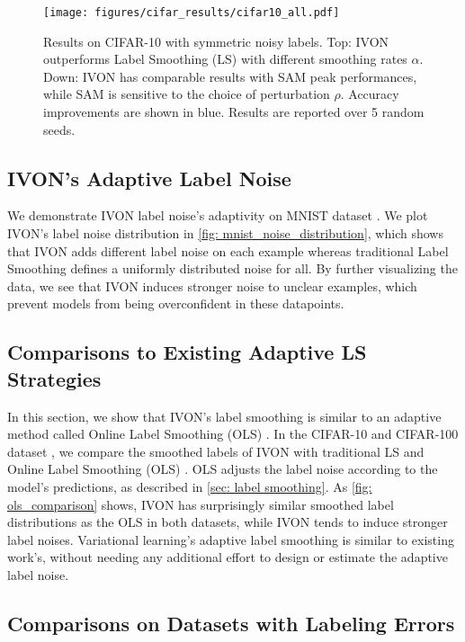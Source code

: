 \begin{figure*}[t!]
	\centering
	\texttt{[image: figures/cifar\_results/cifar10\_all.pdf]}
	\caption{Results on CIFAR-10 with symmetric noisy labels. Top: IVON outperforms Label Smoothing (LS) with different smoothing rates $\alpha$. Down: IVON has comparable results with SAM peak performances, while SAM is sensitive to the choice of perturbation $\rho$. Accuracy improvements are shown in blue. Results are reported over 5 random seeds.}
	\label{fig:cifar10_all}
\end{figure*}

\subsection{IVON's Adaptive Label Noise}\label{sec: noise analyses}

We demonstrate IVON label noise's adaptivity on MNIST dataset \citep{lecun-mnisthandwrittendigit-2010}. We plot IVON's label noise distribution in \cref{fig: mnist_noise_distribution}, which shows that IVON adds different label noise on each example whereas traditional Label Smoothing defines a uniformly distributed noise for all. By further visualizing the data, we see that IVON induces stronger noise to unclear examples, which prevent models from being overconfident in these datapoints. 

\subsection{Comparisons to Existing Adaptive LS Strategies}\label{sec: als comparison}

In this section, we show that IVON's label smoothing is similar to an adaptive method called Online Label Smoothing (OLS) \citep{zhang2021delving}. In the CIFAR-10 and CIFAR-100 dataset \citep{krizhevsky2009cifar}, we compare the smoothed labels of IVON with traditional LS \citep{Szegedy_rethinking} and Online Label Smoothing (OLS) \citep{zhang2021delving}. OLS adjusts the label noise according to the model's predictions, as described in \cref{sec: label smoothing}. As \cref{fig: ols_comparison} shows, IVON has surprisingly similar smoothed label distributions as the OLS in both datasets, while IVON tends to induce stronger label noises. Variational learning's adaptive label smoothing is similar to existing work's, without needing any additional effort to design or estimate the adaptive label noise.

\subsection{Comparisons on Datasets with Labeling Errors} \label{sec: mislabelled data}


